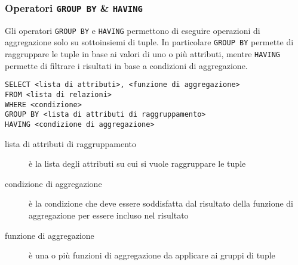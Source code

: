         \subsubsection{Operatori \texttt{GROUP BY} \& \texttt{HAVING}}
            Gli operatori \texttt{GROUP BY} e \texttt{HAVING} permettono di eseguire operazioni di aggregazione solo su sottoinsiemi di tuple.
            In particolare \texttt{GROUP BY} permette di raggruppare le tuple in base ai valori di uno o più attributi, mentre \texttt{HAVING} permette di filtrare i risultati in base a condizioni di aggregazione.
            \begin{lstlisting}
SELECT <lista di attributi>, <funzione di aggregazione>
FROM <lista di relazioni>
WHERE <condizione>
GROUP BY <lista di attributi di raggruppamento>
HAVING <condizione di aggregazione>
            \end{lstlisting}
            \begin{description}
                \item[\<lista di attributi di raggruppamento\>] è la lista degli attributi su cui si vuole raggruppare le tuple
                \item[\<condizione di aggregazione\>] è la condizione che deve essere soddisfatta dal risultato della funzione di aggregazione per essere incluso nel risultato
                \item[\<funzione di aggregazione\>] è una o più funzioni di aggregazione da applicare ai gruppi di tuple
            \end{description}
